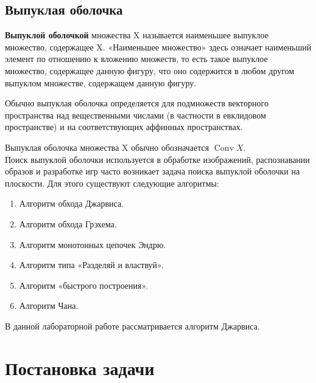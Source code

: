 \documentclass[a4paper, 12pt]{article}
\begin{document}
\subsection{Выпуклая оболочка}

\textbf{Выпуклой оболочкой} множества {X} называется наименьшее выпуклое множество, содержащее {X}. «Наименьшее множество» здесь означает наименьший элемент по отношению к вложению множеств, то есть такое выпуклое множество, содержащее данную фигуру, что оно содержится в любом другом выпуклом множестве, содержащем данную фигуру.

Обычно выпуклая оболочка определяется для подмножеств векторного пространства над вещественными числами (в частности в евклидовом пространстве) и на соответствующих аффинных пространствах.

Выпуклая оболочка множества {X} обычно обозначается $\operatorname {Conv}X$.\\[2mm]

Поиск выпуклой оболочки используется в обработке изображений, распознавании образов и разработке игр часто возникает задача поиска выпуклой оболочки на плоскости. Для этого существуют следующие алгоритмы: \\[2mm]

\begin{enumerate}
  \item Алгоритм обхода Джарвиса.
  \item Алгоритм обхода Грэхема.
  \item Алгоритм монотонных цепочек Эндрю.
  \item Алгоритм типа «Разделяй и властвуй».
  \item Алгоритм «быстрого построения».
  \item Алгоритм Чана.
\end{enumerate}







В данной лабораторной работе рассматривается алгоритм Джарвиса.

\newpage
\section{Постановка задачи}
\end{document}
